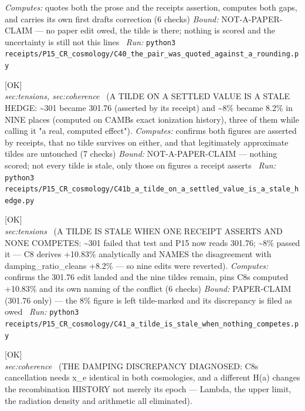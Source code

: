 \begin{description}
\emph{Computes:} quotes both the prose and the receipts assertion, computes both gaps, and carries its own first drafts correction (6 checks)
 \emph{Bound:} NOT-A-PAPER-CLAIM --- no paper edit owed, the tilde is there; nothing is scored and the uncertainty is still not this lines
\ \emph{Run:} \texttt{python3 receipts/P15\_CR\_cosmology/C40\_the\_pair\_was\_quoted\_against\_a\_rounding.py}
\item[\label{rcpt:C41b_a_tilde_on_a_settled_value_is_a_stale_hedge}\texttt{C41b\_a\_tilde\_on\_a\_settled\_value\_is\_a\_stale\_hedge}]\hfill\textsf{[OK]}\\
\textit{sec:tensions, sec:coherence} \ (A TILDE ON A SETTLED VALUE IS A STALE HEDGE: \textasciitilde{}301 became 301.76 (asserted by its receipt) and \textasciitilde{}8\% became 8.2\% in NINE places (computed on CAMBs exact ionization history), three of them while calling it "a real, computed effect"). 
\emph{Computes:} confirms both figures are asserted by receipts, that no tilde survives on either, and that legitimately approximate tildes are untouched (7 checks)
 \emph{Bound:} NOT-A-PAPER-CLAIM --- nothing scored; not every tilde is stale, only those on figures a receipt asserts
\ \emph{Run:} \texttt{python3 receipts/P15\_CR\_cosmology/C41b\_a\_tilde\_on\_a\_settled\_value\_is\_a\_stale\_hedge.py}
\item[\label{rcpt:C41_a_tilde_is_stale_when_nothing_competes}\texttt{C41\_a\_tilde\_is\_stale\_when\_nothing\_competes}]\hfill\textsf{[OK]}\\
\textit{sec:tensions} \ (A TILDE IS STALE WHEN ONE RECEIPT ASSERTS AND NONE COMPETES: \textasciitilde{}301 failed that test and P15 now reads 301.76; \textasciitilde{}8\% passed it --- C8 derives +10.83\% analytically and NAMES the disagreement with damping\_ratio\_cleans +8.2\% --- so nine edits were reverted). 
\emph{Computes:} confirms the 301.76 edit landed and the nine tildes remain, pins C8s computed +10.83\% and its own naming of the conflict (6 checks)
 \emph{Bound:} PAPER-CLAIM (301.76 only) --- the 8\% figure is left tilde-marked and its discrepancy is filed as owed
\ \emph{Run:} \texttt{python3 receipts/P15\_CR\_cosmology/C41\_a\_tilde\_is\_stale\_when\_nothing\_competes.py}
\item[\label{rcpt:C42_the_cancellation_needs_xe_identical}\texttt{C42\_the\_cancellation\_needs\_xe\_identical}]\hfill\textsf{[OK]}\\
\textit{sec:coherence} \ (THE DAMPING DISCREPANCY DIAGNOSED: C8s cancellation needs x\_e identical in both cosmologies, and a different H(a) changes the recombination HISTORY not merely its epoch --- Lambda, the upper limit, the radiation density and arithmetic all eliminated). 

\end{description}
